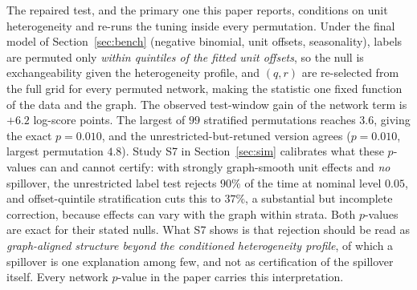\documentclass[12pt]{article}
\theoremstyle{plain}
\theoremstyle{definition}
\theoremstyle{remark}
\newcommand{\DeltaNetFinal}{6.2}
\newcommand{\StratP}{0.010}
\newcommand{\UnrestP}{0.010}
\begin{document}
The repaired test, and the primary one this paper reports, conditions on unit heterogeneity and re-runs the tuning inside every permutation. Under the final model of Section~\ref{sec:bench} (negative binomial, unit offsets, seasonality), labels are permuted only \emph{within quintiles of the fitted unit offsets}, so the null is exchangeability given the heterogeneity profile, and $(q,r)$ are re-selected from the full grid for every permuted network, making the statistic one fixed function of the data and the graph. The observed test-window gain of the network term is $+\DeltaNetFinal$ log-score points. The largest of $99$ stratified permutations reaches $3.6$, giving the exact $p=\StratP$, and the unrestricted-but-retuned version agrees ($p=\UnrestP$, largest permutation $4.8$). Study S7 in Section~\ref{sec:sim} calibrates what these $p$-values can and cannot certify: with strongly graph-smooth unit effects and \emph{no} spillover, the unrestricted label test rejects $90\%$ of the time at nominal level $0.05$, and offset-quintile stratification cuts this to $37\%$, a substantial but incomplete correction, because effects can vary with the graph within strata. Both $p$-values are exact for their stated nulls. What S7 shows is that rejection should be read as \emph{graph-aligned structure beyond the conditioned heterogeneity profile}, of which a spillover is one explanation among few, and not as certification of the spillover itself. Every network $p$-value in the paper carries this interpretation.
\end{document}
